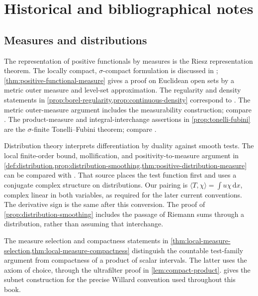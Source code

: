 \chapter{Historical and bibliographical notes}
\label{chap:h01}
\section{Measures and distributions}
\label{sec:history-measures}
The representation of positive functionals by measures is the Riesz representation theorem. The locally compact, $\sigma$-compact formulation is discussed in \cite[Theorem 24]{Tao09Radon}; \cref{thm:positive-functional-measure} gives a proof on Euclidean open sets by a metric outer measure and level-set approximation. The regularity and density statements in \cref{prop:borel-regularity,prop:continuous-density} correspond to \cite[Theorem 21, Exercise 22 and Proposition 10]{Tao09Radon}. The metric outer-measure argument includes the measurability construction; compare \cite[Theorem 5]{Tao10Products}. The product-measure and integral-interchange assertions in \cref{prop:tonelli-fubini} are the $\sigma$-finite Tonelli--Fubini theorem; compare \cite[Theorem 36 and its proof]{Tao10Products}.

Distribution theory interprets differentiation by duality against smooth tests. The local finite-order bound, mollification, and positivity-to-measure argument in \cref{def:distribution,prop:distribution-smoothing,thm:positive-distribution-measure} can be compared with \cite[Section 1, Exercises 4--5; Section 2, Definition 1, Exercise 15 and Lemma 2]{Tao09Distributions}. That source places the test function first and uses a conjugate complex structure on distributions. Our pairing is $\langle T,\chi\rangle=\int u\chi\,\mathrm d x$, complex linear in both variables, as required for the later current conventions. The derivative sign is the same after this conversion. The proof of \cref{prop:distribution-smoothing} includes the passage of Riemann sums through a distribution, rather than assuming that interchange.

The measure selection and compactness statements in \cref{thm:local-measure-selection,thm:local-measure-compactness} distinguish the countable test-family argument from compactness of a product of scalar intervals. The latter uses the axiom of choice, through the ultrafilter proof in \cref{lem:compact-product}.  gives the subnet construction for the precise Willard convention used throughout this book.

